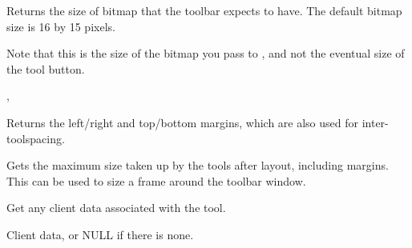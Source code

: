 Returns the size of bitmap that the toolbar expects to have. The default bitmap size is 16 by 15 pixels.


Note that this is the size of the bitmap you pass to ,
and not the eventual size of the tool button.


,\rtfsp
{}

\label{wxtoolbarbasegetmargins}


Returns the left/right and top/bottom margins, which are also used for inter-toolspacing.



\label{wxtoolbarbasegetmaxsize}


Gets the maximum size taken up by the tools after layout, including margins.
This can be used to size a frame around the toolbar window.




\label{wxtoolbarbasegettoolclientdata}


Get any client data associated with the tool.




Client data, or NULL if there is none.

\label{wxtoolbarbasegettoolenabled}

